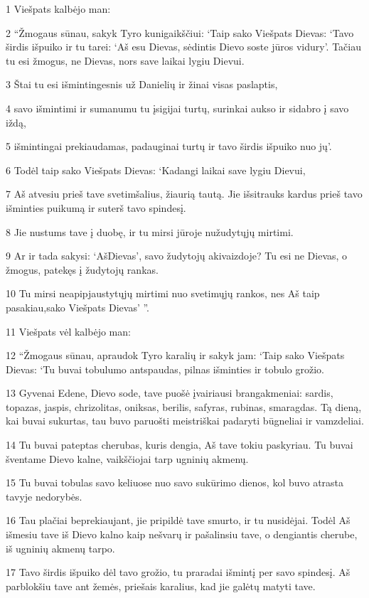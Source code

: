\par 1 Viešpats kalbėjo man: 
\par 2 “Žmogaus sūnau, sakyk Tyro kunigaikščiui: ‘Taip sako Viešpats Dievas: ‘Tavo širdis išpuiko ir tu tarei: ‘Aš esu Dievas, sėdintis Dievo soste jūros vidury’. Tačiau tu esi žmogus, ne Dievas, nors save laikai lygiu Dievui. 
\par 3 Štai tu esi išmintingesnis už Danielių ir žinai visas paslaptis, 
\par 4 savo išmintimi ir sumanumu tu įsigijai turtų, surinkai aukso ir sidabro į savo iždą, 
\par 5 išmintingai prekiaudamas, padauginai turtų ir tavo širdis išpuiko nuo jų’. 
\par 6 Todėl taip sako Viešpats Dievas: ‘Kadangi laikai save lygiu Dievui, 
\par 7 Aš atvesiu prieš tave svetimšalius, žiaurią tautą. Jie išsitrauks kardus prieš tavo išminties puikumą ir suterš tavo spindesį. 
\par 8 Jie nustums tave į duobę, ir tu mirsi jūroje nužudytųjų mirtimi. 
\par 9 Ar ir tada sakysi: ‘Aš­Dievas’, savo žudytojų akivaizdoje? Tu esi ne Dievas, o žmogus, patekęs į žudytojų rankas. 
\par 10 Tu mirsi neapipjaustytųjų mirtimi nuo svetimųjų rankos, nes Aš taip pasakiau,­sako Viešpats Dievas’ ”. 
\par 11 Viešpats vėl kalbėjo man: 
\par 12 “Žmogaus sūnau, apraudok Tyro karalių ir sakyk jam: ‘Taip sako Viešpats Dievas: ‘Tu buvai tobulumo antspaudas, pilnas išminties ir tobulo grožio. 
\par 13 Gyvenai Edene, Dievo sode, tave puošė įvairiausi brangakmeniai: sardis, topazas, jaspis, chrizolitas, oniksas, berilis, safyras, rubinas, smaragdas. Tą dieną, kai buvai sukurtas, tau buvo paruošti meistriškai padaryti būgneliai ir vamzdeliai. 
\par 14 Tu buvai pateptas cherubas, kuris dengia, Aš tave tokiu paskyriau. Tu buvai šventame Dievo kalne, vaikščiojai tarp ugninių akmenų. 
\par 15 Tu buvai tobulas savo keliuose nuo savo sukūrimo dienos, kol buvo atrasta tavyje nedorybės. 
\par 16 Tau plačiai beprekiaujant, jie pripildė tave smurto, ir tu nusidėjai. Todėl Aš išmesiu tave iš Dievo kalno kaip nešvarų ir pašalinsiu tave, o dengiantis cherube, iš ugninių akmenų tarpo. 
\par 17 Tavo širdis išpuiko dėl tavo grožio, tu praradai išmintį per savo spindesį. Aš parblokšiu tave ant žemės, priešais karalius, kad jie galėtų matyti tave. 
